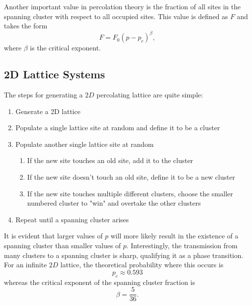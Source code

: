 \documentclass[12pt]{article}
\begin{document}
Another important value in percolation theory is the fraction of all sites in the spanning cluster with respect to all occupied sites. This value is defined as $F$ and takes the form
\begin{equation}
  \label{eq:spanningfraction}
  F = F_0 \left(p - p_c\right)^\beta,
\end{equation}
where $\beta$ is the critical exponent.

\subsection{2D Lattice Systems}
\label{sec:lattice}

The steps for generating a $2D$ percolating lattice are quite simple:
\begin{enumerate}
  \label{code:percolatinglattice}
  \item Generate a 2D lattice
  \item Populate a single lattice site at random and define it to be a cluster
  \item Populate another single lattice site at random
  \begin{enumerate}
    \item If the new site touches an old site, add it to the cluster
    \item If the new site doesn't touch an old site, define it to be a new cluster
    \item If the new site touches multiple different clusters, choose the smaller numbered cluster to "win" and overtake the other clusters
  \end{enumerate}
  \item Repeat until a spanning cluster arises
\end{enumerate}

It is evident that larger values of $p$ will more likely result in the existence of a spanning cluster than smaller values of $p$. Interestingly, the transmission from many clusters to a spanning cluster is sharp, qualifying it as a phase transition. For an infinite $2D$ lattice, the theoretical probability where this occurs is
\begin{equation}
  \label{eq:theoreticalpc}
  p_c \approx 0.593
\end{equation}
whereas the critical exponent of the spanning cluster fraction is
\begin{equation}
  \label{eq:theoreticalbeta}
  \beta = \frac{5}{36}.
\end{equation}
\end{document}
